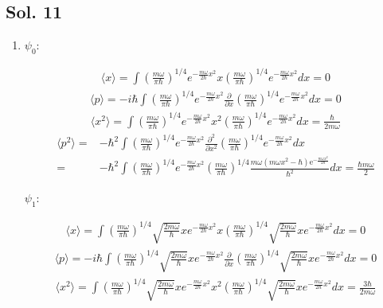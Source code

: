 \subsection*{Sol. 11}
\begin{enumerate}
    \item $\psi_0:$

\begin{align*}
    \langle
     x
     \rangle
     = \int (\frac{m\omega}{\pi\hbar})^{1/4}
     e^{-\frac{m\omega}{2\hbar}x^2}
     x(\frac{m\omega}{\pi\hbar})^{1/4}
     e^{-\frac{m\omega}{2\hbar}x^2}dx = 0 
\end{align*}
\begin{align*}
    \langle
     p
     \rangle
     = -i\hbar\int
     (\frac{m\omega}{\pi\hbar})^{1/4}
     e^{-\frac{m\omega}{2\hbar}x^2}
     \frac{\partial}{\partial x}(\frac{m\omega}{\pi\hbar})^{1/4}
     e^{-\frac{m\omega}{2\hbar}x^2}
     dx = 0 
\end{align*}
\begin{align*}
    \langle
     x^2
     \rangle
     = \int (\frac{m\omega}{\pi\hbar})^{1/4}
     e^{-\frac{m\omega}{2\hbar}x^2}
     x^2(\frac{m\omega}{\pi\hbar})^{1/4}
     e^{-\frac{m\omega}{2\hbar}x^2}dx = \frac{\hbar}{2m\omega}
\end{align*}
\begin{align*}
    \langle
     p^2
     \rangle
     =& -\hbar^2\int (\frac{m\omega}{\pi\hbar})^{1/4}
     e^{-\frac{m\omega}{2\hbar}x^2}
     \frac{\partial^2}{\partial x^2}(\frac{m\omega}{\pi\hbar})^{1/4}
     e^{-\frac{m\omega}{2\hbar}x^2}dx \\
     =&  -\hbar^2\int (\frac{m\omega}{\pi\hbar})^{1/4}
     e^{-\frac{m\omega}{2\hbar}x^2}
     (\frac{m\omega}{\pi\hbar})^{1/4}
     \frac{m{\omega} \left(m{\omega}x^{2} - \hbar\right) \mathrm{e}^{-\frac{m{\omega}x^{2}}{2\hbar}}}{\hbar^{2}} dx = \frac{\hbar m \omega}{2}
\end{align*}


$\psi_1:$

\begin{align*}
    \langle
     x
     \rangle
     = \int (\frac{m\omega}{\pi\hbar})^{1/4}
     \sqrt{\frac{2m\omega}{\hbar}}x
     e^{-\frac{m\omega}{2\hbar}x^2}
     x(\frac{m\omega}{\pi\hbar})^{1/4}
     \sqrt{\frac{2m\omega}{\hbar}}x
     e^{-\frac{m\omega}{2\hbar}x^2}dx = 0 
\end{align*}
\begin{align*}
    \langle
     p
     \rangle
     = -i\hbar\int
     (\frac{m\omega}{\pi\hbar})^{1/4}
     \sqrt{\frac{2m\omega}{\hbar}}x
     e^{-\frac{m\omega}{2\hbar}x^2}
     \frac{\partial}{\partial x}(\frac{m\omega}{\pi\hbar})^{1/4}
     \sqrt{\frac{2m\omega}{\hbar}}x
     e^{-\frac{m\omega}{2\hbar}x^2}
     dx = 0 
\end{align*}
\begin{align*}
    \langle
     x^2
     \rangle
     = \int (\frac{m\omega}{\pi\hbar})^{1/4}
     \sqrt{\frac{2m\omega}{\hbar}}x
     e^{-\frac{m\omega}{2\hbar}x^2}
     x^2(\frac{m\omega}{\pi\hbar})^{1/4}
     \sqrt{\frac{2m\omega}{\hbar}}x
     e^{-\frac{m\omega}{2\hbar}x^2}dx
     = \frac{3\hbar}{2m\omega}
\end{align*}


\end{enumerate}
